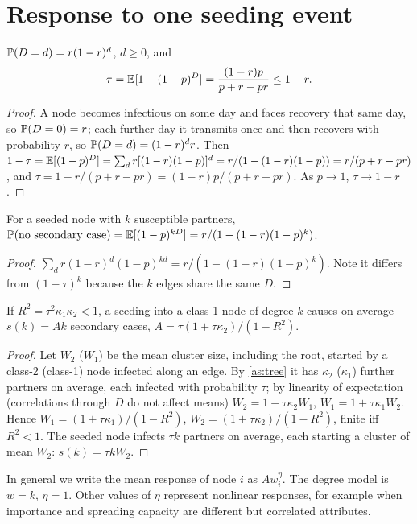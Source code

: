 \section{Response to one seeding event}\label{sec:response}

\begin{lemma}
$\mathbb{P}(D=d)=r(1-r)^d$, $d\ge0$, and
\[
\tau=\mathbb{E}[1-(1-p)^D]=\frac{(1-r)p}{p+r-pr}\le1-r.
\]
\end{lemma}
\begin{proof}
A node becomes infectious on some day and faces recovery that same day, so
$\mathbb{P}(D=0)=r$; each further day it transmits once and then recovers with
probability $r$, so $\mathbb{P}(D=d)=(1-r)^dr$. Then
$1-\tau=\mathbb{E}[(1-p)^D]=\sum_dr[(1-r)(1-p)]^d=r/(1-(1-r)(1-p))=r/(p+r-pr)$, and
$\tau=1-r/(p+r-pr)=(1-r)p/(p+r-pr)$. As $p\to1$, $\tau\to1-r$.
\end{proof}

\begin{lemma}
For a seeded node with $k$ susceptible partners,
$\mathbb{P}(\text{no secondary case})=\mathbb{E}[(1-p)^{kD}]=r/(1-(1-r)(1-p)^k)$.
\end{lemma}
\begin{proof}
$\sum_dr(1-r)^d(1-p)^{kd}=r/(1-(1-r)(1-p)^k)$. Note it differs from $(1-\tau)^k$
because the $k$ edges share the same $D$.
\end{proof}

\begin{proposition}\label{prop:linear}
If $R^2=\tau^2\kappa_1\kappa_2<1$, a seeding into a class-1 node of degree $k$ causes
on average $s(k)=Ak$ secondary cases, $A=\tau(1+\tau\kappa_2)/(1-R^2)$.
\end{proposition}
\begin{proof}
Let $W_2$ ($W_1$) be the mean cluster size, including the root, started by a
class-2 (class-1) node infected along an edge. By \ref{as:tree} it has $\kappa_2$
($\kappa_1$) further partners on average, each infected with probability $\tau$; by
linearity of expectation (correlations through $D$ do not affect means)
$W_2=1+\tau\kappa_2W_1$, $W_1=1+\tau\kappa_1W_2$. Hence $W_1=(1+\tau\kappa_1)/(1-R^2)$,
$W_2=(1+\tau\kappa_2)/(1-R^2)$, finite iff $R^2<1$. The seeded node infects $\tau k$
partners on average, each starting a cluster of mean $W_2$: $s(k)=\tau kW_2$.
\end{proof}

\begin{remark}
In general we write the mean response of node $i$ as $Aw_i^\eta$. The degree
model is $w=k$, $\eta=1$. Other values of $\eta$ represent nonlinear responses,
for example when importance and spreading capacity are different but
correlated attributes.
\end{remark}

